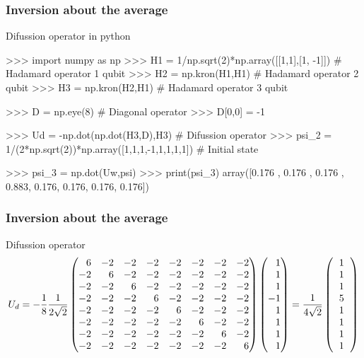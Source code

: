 \begin{frame}[fragile]{}
	\frametitle{Inversion about the average}
	\begin{exampleblock}{Difussion operator in python}
		\vspace*{0.5cm}
		\begin{adjustbox}{max width=0.9\textwidth}
			\begin{python}
>>> import numpy as np
>>> H1 = 1/np.sqrt(2)*np.array([[1,1],[1, -1]]) # Hadamard operator 1 qubit
>>> H2 = np.kron(H1,H1) # Hadamard operator 2 qubit
>>> H3 = np.kron(H2,H1) # Hadamard operator 3 qubit

>>> D = np.eye(8) # Diagonal operator
>>> D[0,0] = -1

>>> Ud = -np.dot(np.dot(H3,D),H3) # Difussion operator
>>> psi_2 = 1/(2*np.sqrt(2))*np.array([1,1,1,-1,1,1,1,1]) # Initial state

>>> psi_3 = np.dot(Uw,psi)
>>> print(psi_3)
array([0.176 , 0.176 , 0.176 , 0.883, 0.176, 0.176, 0.176, 0.176])
			\end{python}
		\end{adjustbox}
	\end{exampleblock}

\end{frame}
\begin{frame}
	\frametitle{Inversion about the average}
	\begin{exampleblock}{Difussion operator}
	\begin{eqnarray}
	U_d = -\frac{1}{8}\frac{1}{2\sqrt{2}}\begin{pmatrix*}[r]
	6 & -2 & -2 & -2 & -2 & -2 & -2 & -2\\
	-2 & 6 & -2 & -2 & -2 & -2 & -2 & -2\\
	-2 & -2 & 6 & -2 & -2 & -2 & -2 & -2\\
	-2 & -2 & -2 & 6 & -2 & -2 & -2 & -2\\
	-2 & -2 & -2 & -2 & 6 & -2 & -2 & -2\\
	-2 & -2 & -2 & -2 & -2 & 6 & -2 & -2\\
	-2 & -2 & -2 & -2 & -2 & -2 & 6 & -2\\
	-2 & -2 & -2 & -2 & -2 & -2 & -2 & 6
	\end{pmatrix*}
		\begin{pmatrix*}[r]
		1\\
		1\\
		1\\
		-1\\
		1\\
		1\\
		1\\
		1
		\end{pmatrix*}=\frac{1}{4\sqrt{2}}
		\left(
		\begin{tabular}{c}
		1\\
		1\\
		1\\
		5\\
		1\\
		1\\
		1\\
		1
		\end{tabular}
		\right)\nonumber
	\end{eqnarray}
	\end{exampleblock}
\end{frame}